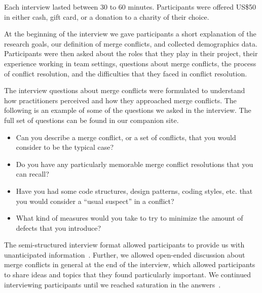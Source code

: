 
Each interview lasted between 30 to 60 minutes. Participants were offered US\$50 in either cash, gift card, or a donation to a charity of their choice.

At the beginning of the interview we gave participants a short explanation of the research goals, our definition of merge conflicts, and collected demographics data. 
Participants were then asked about the roles that they play in their project, their experience working in team settings,  questions about merge conflicts, the process of conflict resolution, and the difficulties that they faced in conflict resolution. 


The interview questions about merge conflicts were formulated to understand how practitioners perceived and how they approached merge conflicts.
The following is an example of some of the questions we asked in the interview. The full set of questions can be found in our companion site\cite{companion_site}.
\begin{itemize}
	\item Can you describe a merge conflict, or a set of conflicts, that you would consider to be the typical case?
	\item Do you have any particularly memorable merge conflict resolutions that you can recall?
	\item Have you had some code structures, design patterns, coding styles, etc. that you would consider a ``usual suspect'' in a conflict?
	\item What kind of measures would you take to try to minimize the amount of defects that you introduce?
\end{itemize}


The semi-structured interview format allowed participants to provide us with unanticipated information~\cite{seaman2008qualitative}. Further, we allowed open-ended discussion about merge conflicts in general at the end of the interview, which allowed participants to share ideas and topics that they found particularly important. We continued interviewing participants until we reached saturation in the answers~\cite{fusch2015we}.

